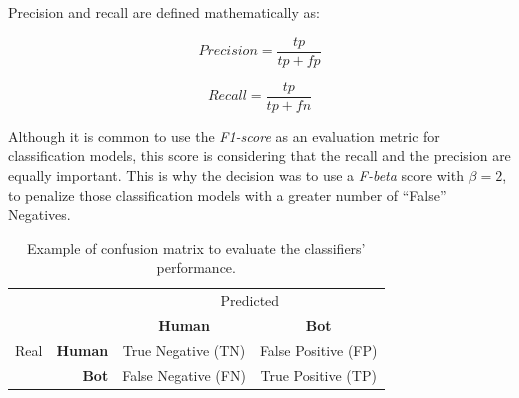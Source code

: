 \documentclass[a4paper, 12pt]{book}
\begin{document}
Precision and recall are defined mathematically as:
\begin{center}
\begin{equation}
Precision = \frac{tp}{tp+fp}
\end{equation}

\begin{equation}
Recall = \frac{tp}{tp+fn}
\end{equation}
\end{center}

Although it is common to use the \emph{F1-score} as an evaluation metric for classification models, this score is considering that the recall and the precision are equally important. This is why the decision was to use a \emph{F-beta} score with $\beta = 2$, to penalize those classification models with a greater number of ``False'' Negatives.

\begin{table}[tb]
\renewcommand{\arraystretch}{1.5}
\begin{center}
\begin{tabular}{ l r c c }
\toprule
      &                & \multicolumn{2}{c}{Predicted} \tabularnewline
      &                & \textbf{Human}                              & \textbf{Bot} \\
                         
 Real & \textbf{Human} & \cellcolor[HTML]{67FD9A}True Negative (TN)  & \cellcolor[HTML]{FD6864}False Positive (FP) \\ %
      & \textbf{Bot}   & \cellcolor[HTML]{FD6864}False Negative (FN) & \cellcolor[HTML]{67FD9A}True Positive (TP) \\ %
\bottomrule
\end{tabular}
\caption{Example of confusion matrix to evaluate the classifiers' performance.}
\label{table:example-confusion-matrix}
\end{center}
\end{table}


\end{document}
